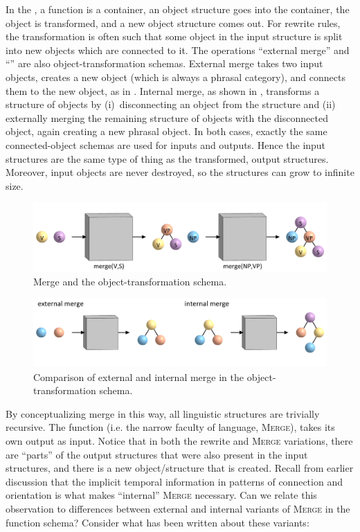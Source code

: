   In the , a function is a container, an object structure goes into the container, the object is transformed, and a new object structure comes out. For rewrite rules, the transformation is often such that some object in the input structure is split into new objects which are connected to it. The operations “external merge” and “” are also object-transformation schemas. External merge takes two input objects, creates a new object (which is always a phrasal category), and connects them to the new object, as in {}. Internal merge, as shown in {}, transforms a structure of objects by (i)~disconnecting an object from the structure and (ii) externally merging the remaining structure of objects with the disconnected object, again creating a new phrasal object. In both cases, exactly the same connected-object schemas are used for inputs and outputs. Hence the input structures are the same type of thing as the transformed, output structures. Moreover, input objects are never destroyed, so the structures can grow to infinite size.

  
\begin{figure}
\includegraphics[width=\textwidth]{figures/Tilsen-img108.png}
\caption{Merge and the object-transformation schema.}
\label{fig:5:4}
\end{figure}
 
\begin{figure}
\includegraphics[width=\textwidth]{figures/Tilsen-img109.png}
\caption{Comparison of external and internal merge in the object-transformation schema.}
\label{fig:5:5}
\end{figure}

  By conceptualizing merge in this way, all linguistic structures are trivially recursive. The function (i.e. the narrow faculty of language, \textsc{Merge}), takes its own output as input. Notice that in both the rewrite and \textsc{Merge} variations, there are “parts” of the output structures that were also present in the input structures, and there is a new object/structure that is created. Recall from earlier discussion that the implicit temporal information in patterns of connection and orientation is what makes “internal” \textsc{Merge} necessary. Can we relate this observation to differences between external and internal variants of \textsc{Merge} in the function schema? Consider what has been written about these variants:

